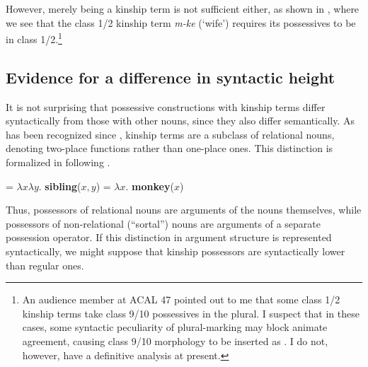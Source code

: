 \documentclass[output=paper,newtxmath,modfonts,nonflat,hidelinks]{langsci/langscibook}
\begin{document}
However, merely being a kinship term is not sufficient either, as shown in , where we see that the class 1/2 kinship term \textit{m-ke} (‘wife’) requires its possessives to be in class 1/2.\footnote{An audience member at ACAL 47 pointed out to me that some class 1/2 kinship terms take class 9/10 possessives in the plural.  I suspect that in these cases, some syntactic peculiarity of plural-marking may block animate agreement, causing class 9/10 morphology to be inserted as .  I do not, however, have a definitive analysis at present.}

\ea\label{ex:pesetsky:crastton} 
      
  \z \z



\subsection{Evidence for a difference in syntactic height}\label{sec:pesetsky:syntacticheight}

It is not surprising that possessive constructions with kinship terms differ syntactically from those with other nouns, since they also differ semantically.  As has been recognized since \citet{partee8397}, kinship terms are a subclass of relational nouns, denoting two-place functions rather than one-place ones. This distinction is formalized in  following \citet{barker95}.

\ea\label{ex:pesetsky:lfkwakweli} \ea\label{ex:pesetsky:lfkwakwelia} {  = $\lambda x \lambda y$. \textbf{sibling}($x,y$) }
\ex\label{ex:pesetsky:lfkwakwelib} {  = $\lambda x.$ \textbf{monkey}($x$) \\ } \z \z

Thus, possessors of relational nouns are arguments of the nouns themselves, while possessors of non-relational (``sortal'') nouns are arguments of a separate possession operator. If this distinction in argument structure is represented syntactically, we might suppose that kinship possessors are syntactically lower than regular ones. 
\end{document}
